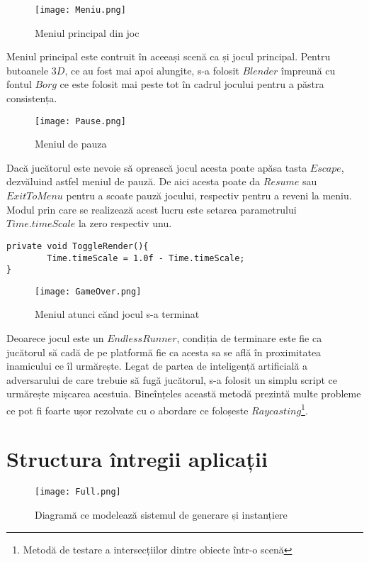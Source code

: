 \vspace{10mm}
\begin{figure}[H]
\centering
\texttt{[image: Meniu.png]} \par
\caption{Meniul principal din joc}
\end{figure}

Meniul principal este contruit în aceeași scenă ca și jocul principal. Pentru butoanele $3D$, ce au fost mai apoi alungite, s-a folosit $Blender$ împreună cu fontul $Borg$ ce este folosit mai peste tot în cadrul jocului pentru a păstra consistența.\par

\vspace{10mm}
\begin{figure}[H]
\centering
\texttt{[image: Pause.png]} \par
\caption{Meniul de pauza}
\end{figure}

Dacă jucătorul este nevoie să oprească jocul acesta poate apăsa tasta $Escape$, dezvăluind astfel meniul de pauză. De aici acesta poate da $Resume$ sau $Exit To Menu$ pentru a scoate pauză jocului, respectiv pentru a reveni la meniu. Modul prin care se realizează acest lucru este setarea parametrului $Time.timeScale$ la zero respectiv unu.\par

\begin{lstlisting}[caption=Exemplu de folosire a $Time.timeScale$]
private void ToggleRender(){
        Time.timeScale = 1.0f - Time.timeScale;
}
\end{lstlisting}

\vspace{10mm}
\begin{figure}[H]
\centering
\texttt{[image: GameOver.png]} \par
\caption{Meniul atunci cănd jocul s-a terminat}
\end{figure}

Deoarece jocul este un $EndlessRunner$, condiția de terminare este fie ca jucătorul să cadă de pe platformă fie ca acesta sa se află în proximitatea inamicului ce îl urmărește. Legat de partea de inteligență artificială a adversarului de care trebuie să fugă jucătorul, s-a folosit un simplu script ce urmărește mișcarea acestuia. Bineînțeles această metodă prezintă multe probleme ce pot fi foarte ușor rezolvate cu o abordare ce foloșeste $Raycasting$\footnote{Metodă de testare a intersecțiilor dintre obiecte într-o scenă}.\par

\section{Structura întregii aplicații}

\vspace{10mm}
\begin{figure}[H]
\centering
\texttt{[image: Full.png]} \par
\caption{Diagramă ce modelează sistemul de generare și instanțiere}
\end{figure}
